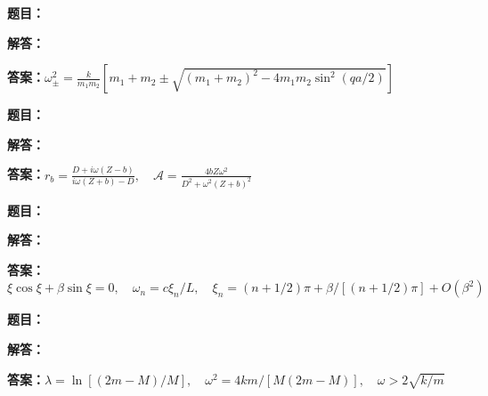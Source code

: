 \documentclass[lang=cn,color=blue,11pt]{elegantbook}
\begin{document}
\par\smallskip\noindent\hrulefill\par\medskip
{}\par
\noindent\textbf{题目：}
\par\noindent\textbf{解答：}
\par\noindent\textbf{答案：}\(\displaystyle \omega_\pm^2=\frac{k}{m_1m_2}\left[m_1+m_2\pm\sqrt{(m_1+m_2)^2-4m_1m_2\sin^2(qa/2)}\right]\)\par
\par\smallskip\noindent\hrulefill\par\medskip
{}\par
\noindent\textbf{题目：}
\par\noindent\textbf{解答：}
\par\noindent\textbf{答案：}\(\displaystyle r_b=\frac{D+i\omega(Z-b)}{i\omega(Z+b)-D},\quad \mathcal A=\frac{4bZ\omega^2}{D^2+\omega^2(Z+b)^2}\)\par
\par\smallskip\noindent\hrulefill\par\medskip
{}\par
\noindent\textbf{题目：}
\par\noindent\textbf{解答：}
\par\noindent\textbf{答案：}\(\displaystyle \xi\cos\xi+\beta\sin\xi=0,\quad \omega_n=c\xi_n/L,\quad \xi_n=(n+1/2)\pi+\beta/[(n+1/2)\pi]+O(\beta^2)\)\par
\par\smallskip\noindent\hrulefill\par\medskip
{}\par
\noindent\textbf{题目：}
\par\noindent\textbf{解答：}
\par\noindent\textbf{答案：}\(\displaystyle \lambda=\ln[(2m-M)/M],\quad\omega^2=4km/[M(2m-M)],\quad\omega>2\sqrt{k/m}\)\par
\end{document}
